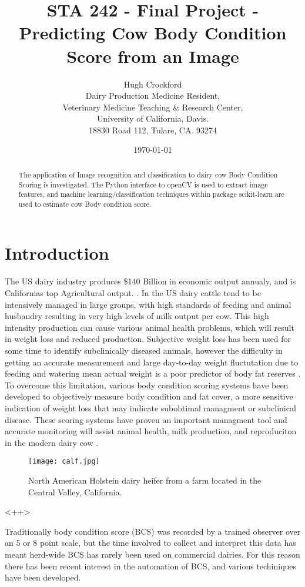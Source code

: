 \documentclass[11pt]{article}
\title{STA 242 - Final Project - Predicting Cow Body Condition Score from an Image}
\author{Hugh Crockford\\
	Dairy Production Medicine Resident,\\
	Veterinary Medicine Teaching \& Research Center,\\
	University of California, Davis.\\
	18830 Road 112, Tulare, CA. 93274\\
}
\date{\today}
\begin{document}
	\maketitle
	\tableofcontents

	\begin{abstract}
		The application of Image recognition and classification to dairy cow Body Condition Scoring is investigated.
		The Python interface to openCV is used to extract image features, and machine learning/classification techniques within package scikit-learn are used to estimate cow Body condition score.
	\end{abstract}

\newpage
\section{Introduction}
		The US dairy industry produces \$140 Billion in economic output annualy, and is Californias top Agricultural output. \cite{cmab13}. 
		In the US dairy cattle tend to be intensively managed in large groups, with high standards of feeding and animal husbandry resulting in very high levels of milk output per cow.
		This high intensity production can cause various animal health problems, which will result in weight loss and reduced production.
		Subjective weight loss has been used for some time to identify subclinically diseased animals, however the difficulty in getting an accurate measurement and large day-to-day weight fluctutation due to feeding and watering mean actual weight is a poor predictor of body fat reserves\cite{Roche2004} .
		To overcome this limitation, various body condition scoring systems have been developed to objectively measure body condition and fat cover, a more sensitive indication of weight loss that may indicate subobtimal managment or subclinical disease\cite{Wildman1982}.
		These scoring systems have proven an important managment tool and accurate monitoring will assist animal health, milk production, and reproduciton in the modern dairy cow \cite{Buckley2003}.


		\begin{figure}[b!]
			\centering
			\texttt{[image: calf.jpg]}
			\caption{North American Holstein dairy heifer from a farm located in the Central Valley, California.}
			\label{fig:<+label+>}
		\end{figure}<++>

		Traditionally body condition score (BCS) was recorded by a trained observer over an 5 or 8 point scale\cite{Bewley2010}, but the time involved to collect and interpret this data has meant herd-wide BCS has rarely been used on commercial dairies.
		For this reason there has been recent interest in the automation of BCS, and various techiniques have been developed.
\end{document}
